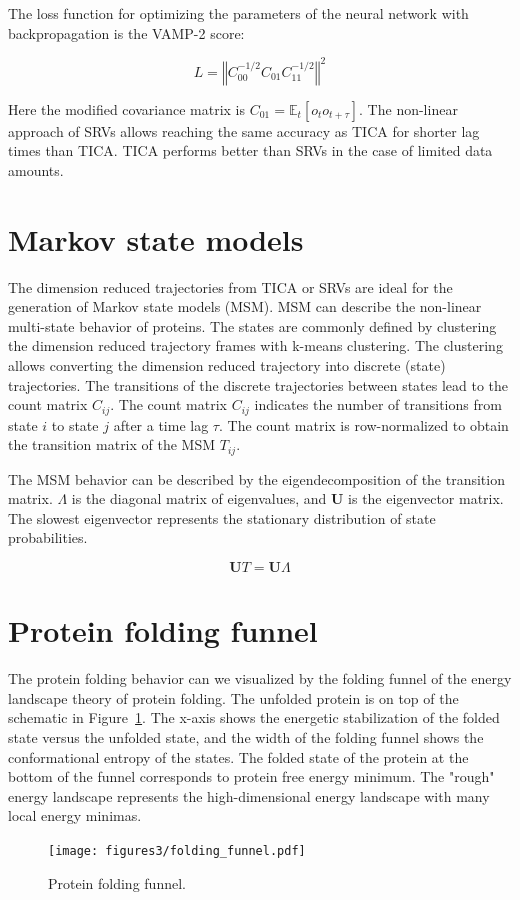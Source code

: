 The loss function for optimizing the parameters of the neural network with backpropagation is the VAMP-2 score:

$$L=\left\Vert C_{00}^{-1/2}C_{01}C_{11}^{-1/2}\right\Vert ^{2}$$

Here the modified covariance matrix is $C_{01}=\ensuremath{\mathbb{E}}_{t}\left[o_{t}o_{t+\tau}\right]$.
The non-linear approach of SRVs allows reaching the same accuracy as TICA for shorter lag times than TICA. TICA performs better than SRVs in the case of limited data amounts.

\section{Markov state models}

The dimension reduced trajectories from TICA or SRVs are ideal for the generation of Markov state models (MSM)\cite{Noe2015}. MSM can describe the non-linear multi-state behavior of proteins. The states are commonly defined by clustering the dimension reduced trajectory frames with k-means clustering. The clustering allows converting the dimension reduced trajectory into discrete (state) trajectories. The transitions of the discrete trajectories between states lead to the count matrix $C_{ij}$. The count matrix $C_{ij}$ indicates the number of transitions from state $i$ to state $j$ after a time lag $\tau$. The count matrix is row-normalized to obtain the transition matrix of the MSM $T_{ij}$.

The MSM behavior can be described by the eigendecomposition of the transition matrix. $\varLambda$ is the diagonal matrix of eigenvalues, and $\mathbf{U}$ is the eigenvector matrix. The slowest eigenvector represents the stationary distribution of state probabilities.

$$\mathbf{U}T=\mathbf{U}\varLambda$$


\section{Protein folding funnel}

The protein folding behavior can we visualized by the folding funnel of the energy landscape theory of protein folding\cite{bryngelson1995p}. The unfolded protein is on top of the schematic in Figure~\ref{fig:funnel}. The x-axis shows the energetic stabilization of the folded state versus the unfolded state, and the width of the folding funnel shows the conformational entropy of the states.  The folded state of the protein at the bottom of the funnel corresponds to protein free energy minimum. The "rough" energy landscape represents the high-dimensional energy landscape with many local energy minimas.

\begin{figure}[H]
  \centering
  \texttt{[image: figures3/folding\_funnel.pdf]}
  \caption{Protein folding funnel.}
  \label{fig:funnel}
\end{figure}



